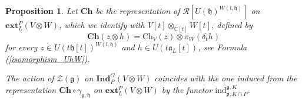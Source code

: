 \documentclass{amsart}
\newtheorem{proposition}[theorem]{Proposition}
\theoremstyle{definition}
\begin{document}
\begin{proposition}\label{action_center_induced_modules}
    Let $\mathbf{Ch}$ be the representation of $\mathcal{R}[U(\mathfrak{h})^{W(\mathfrak{l},\mathfrak{h})}]$ on $\mathbf{ext}_L^P(V \otimes W)$, which we identify with $V[t] \otimes_{\mathbb{C}[t]}W[t]$, defined by
    \[\mathbf{Ch}(z \otimes h) = \mathrm{Ch}_V(z) \otimes\pi_W(\delta_th)\]
    for every $z \in U(t\mathfrak{h}[t])^{W(\mathfrak{l},\mathfrak{h})}$ and $ h\in U(t\mathfrak{a}_L[t])$,
    see Formula (\ref{isomorphism_UhW}).
    
    The action of $\mathcal{Z}(\bm{\mathfrak{g}})$ on $\mathbf{Ind}_P^G(V\otimes W)$ coincides with the one induced from the representation $\mathbf{Ch} \circ \gamma_{\mathfrak{g}, \mathfrak{h}}$ on $\mathbf{ext}_L^P(V \otimes W)$ by the functor $\mathrm{ind}_{\bm{\mathfrak{p}},K\cap P}^{\bm{\mathfrak{g}},K}$.
\end{proposition}
\end{document}
